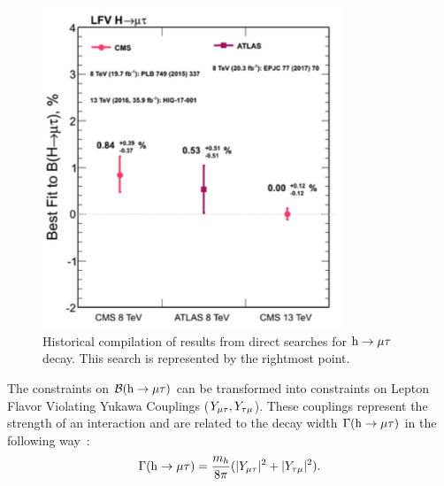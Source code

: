 \begin{figure}[!htpb]\centering
 \captionsetup{width=.8\textwidth,justification=centering}
 \includegraphics[width=0.8\textwidth]{plots_and_figures/chapter8/h125/hist_limit.png}
 \caption{Historical compilation of results from direct searches for $\text{h} \to \mu \tau$ decay. This search is represented by the rightmost point.}
 \label{fig:hist_limits}
\end{figure}


The constraints on $\mathcal{B}(\text{h} \to \mu \tau)$ can be transformed into constraints on Lepton Flavor Violating Yukawa Couplings ($Y_{\mu\tau},Y_{\tau\mu}$). These couplings represent the strength of an interaction and are related to the decay width $\Gamma(\text{h} \to \mu \tau)$ in the following way~\cite{Harnik:2012pb}:
\begin{equation}                                                                                                                                                                                                 
\Gamma(\text{h} \to \mu \tau)=\frac{m_{h}}{8\pi}(|Y_{\mu\tau}|^2 + |Y_{\tau\mu}|^2).                                                          
\label{eq:yuk1}
\end{equation}

